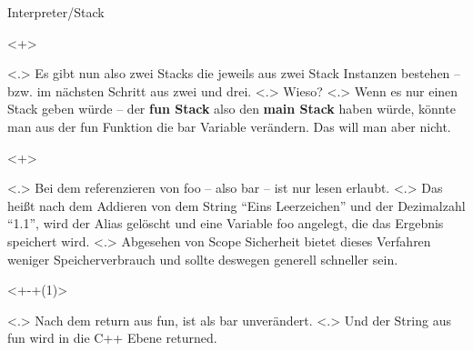 \begin{frame}{Interpreter/Stack}
    \begin{uncoverenv}<+>%
    \end{uncoverenv}%
        \note[item]<.>{
          Es gibt nun also zwei Stacks die jeweils aus zwei Stack Instanzen bestehen -- bzw. im nächsten Schritt aus zwei und drei.
        }
        \note[item]<.>{
          Wieso?
        }
        \note[item]<.>{
          Wenn es nur einen Stack geben würde -- der \textbf{fun Stack} also den \textbf{main Stack} haben würde, könnte man aus der fun Funktion die bar Variable verändern. Das will man aber nicht.
        }

    \begin{uncoverenv}<+>%
    \end{uncoverenv}%
        \note[item]<.>{
          Bei dem referenzieren von foo -- also bar -- ist nur lesen erlaubt.
        }
        \note[item]<.>{
          Das heißt nach dem Addieren von dem String ``Eins Leerzeichen'' und der Dezimalzahl ``1.1'', wird der Alias gelöscht und eine Variable foo angelegt, die das Ergebnis speichert wird.
        }
        \note[item]<.>{
          Abgesehen von Scope Sicherheit bietet dieses Verfahren weniger Speicherverbrauch und sollte deswegen generell schneller sein.
        }

    \begin{uncoverenv}<+-+(1)>%
    \end{uncoverenv}%
        \note[item]<.>{
          Nach dem return aus fun, ist als bar unverändert.
        }
        \note[item]<.>{
          Und der String aus fun wird in die C++ Ebene returned.
        }


\end{frame}
